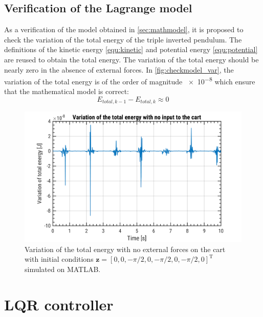 \documentclass[a4paper,12pt]{article}
\begin{document}
\subsection{Verification of the Lagrange model}
As a verification of the model obtained in \autoref{sec:mathmodel}, it is proposed to check the variation of the total energy of the triple inverted pendulum. The definitions of the kinetic energy \eqref{equ:kinetic} and potential energy \eqref{equ:potential} are reused to obtain the total energy. The variation of the total energy should be nearly zero in the absence of external forces. In \autoref{fig:checkmodel_var}, the variation of the total energy is of the order of magnitude \num{e-8} which ensure that the mathematical model is correct:
\[
E_{total,k-1}-E_{total,k} \approx 0
\]
\begin{figure}[ht]
	\centering
	\includegraphics[width=16cm]{illustrations/check_model_variation.png}
	\caption{Variation of the total energy with no external forces on the cart with initial conditions $\mathbf{z}= [0,0,-\pi/2,0,-\pi/2,0,-\pi/2,0]^\text{T}$ simulated on MATLAB.}
	\label{fig:checkmodel_var}
\end{figure}

\section{LQR controller}
\end{document}
